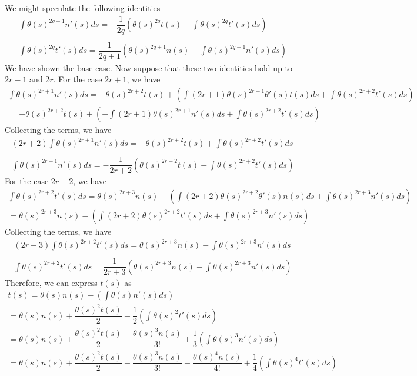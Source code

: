 \documentclass{article}
\begin{document}
	We might speculate the following identities
	\begin{gather*}
		\int \theta(s)^{2q - 1} n'(s) ds = - \dfrac{1}{2q} \left( \theta(s)^{2q} t(s) - \int \theta(s)^{2q} t'(s) ds \right) \\ \\
		\int \theta(s)^{2q} t'(s) ds = \dfrac{1}{2q + 1} \left( \theta(s)^{2q + 1} n(s) - \int \theta(s)^{2q + 1} n'(s) ds \right)
	\end{gather*}
	We have shown the base case. Now suppose that these two identities hold up to $2r - 1$ and $2r$. For the case $2r + 1$, we have
	\begin{gather*}
		\int \theta(s)^{2r + 1} n'(s) ds = - \theta(s)^{2r + 2}t(s) + \left( \int (2r + 1) \theta(s)^{2r + 1} \theta'(s) t(s) ds + \int \theta(s)^{2r + 2} t'(s) ds \right) \\
		= - \theta(s)^{2r + 2}t(s) + \left( - \int (2r + 1) \theta(s)^{2r + 1} n'(s)  ds + \int \theta(s)^{2r + 2} t'(s) ds \right)
	\end{gather*}
	Collecting the terms, we have
	\begin{gather*}
		(2r + 2) \int \theta(s)^{2r + 1} n'(s) ds = - \theta(s)^{2r + 2}t(s) + \int \theta(s)^{2r + 2} t'(s) ds \\ \\
		\int \theta(s)^{2r + 1} n'(s) ds = -\dfrac{1}{2r + 2} \left( \theta(s)^{2r + 2}t(s) - \int \theta(s)^{2r + 2} t'(s) ds \right)
	\end{gather*}
	For the case $2r + 2$, we have
	\begin{gather*}
		\int \theta(s)^{2r + 2} t'(s) ds = \theta(s)^{2r + 3}n(s) - \left( \int (2r + 2) \theta(s)^{2r + 2} \theta'(s) n(s) ds + \int \theta(s)^{2r + 3} n'(s) ds \right) \\
		= \theta(s)^{2r + 3}n(s) - \left( \int (2r + 2) \theta(s)^{2r + 2} t'(s) ds + \int \theta(s)^{2r + 3} n'(s) ds \right)
	\end{gather*}
	Collecting the terms, we have
	\begin{gather*}
		(2r + 3) \int \theta(s)^{2r + 2} t'(s) ds = \theta(s)^{2r + 3}n(s) - \int \theta(s)^{2r + 3} n'(s) ds \\ \\
		\int \theta(s)^{2r + 2} t'(s) ds = \dfrac{1}{2r + 3} \left( \theta(s)^{2r + 3}n(s) - \int \theta(s)^{2r + 3} n'(s) ds \right)
	\end{gather*}
	Therefore, we can express $t(s)$ as
	\begin{gather*}
		t(s) = \theta(s) n(s) - \left( \int \theta(s) n'(s) ds \right) \\
		= \theta(s) n(s) + \dfrac{\theta(s)^2 t(s)}{2} - \dfrac{1}{2} \left( \int \theta(s)^2 t'(s) ds \right) \\
		= \theta(s) n(s) + \dfrac{\theta(s)^2 t(s)}{2} - \dfrac{\theta(s)^3 n(s)}{3!} + \dfrac{1}{3} \left( \int \theta(s)^3 n'(s) ds \right) \\
		= \theta(s) n(s) + \dfrac{\theta(s)^2 t(s)}{2} - \dfrac{\theta(s)^3 n(s)}{3!} -  \dfrac{\theta(s)^4 n(s)}{4!} + \dfrac{1}{4} \left( \int \theta(s)^4 t'(s) ds \right)
	\end{gather*}
\end{document}
